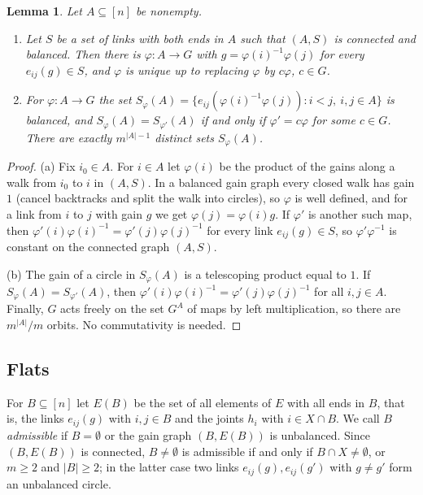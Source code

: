 \documentclass[11pt]{amsart}
\newtheorem{lemma}[theorem]{Lemma}
\theoremstyle{definition}
\theoremstyle{remark}
\numberwithin{equation}{section}
\begin{document}
\begin{lemma}\label{lem:potential}
Let $A\subseteq[n]$ be nonempty.
\begin{enumerate}[label=\textup{(\alph*)}]
\item Let $S$ be a set of links with both ends in $A$ such that $(A,S)$ is connected and balanced. Then there is $\varphi\colon A\to G$ with $g=\varphi(i)^{-1}\varphi(j)$ for every $e_{ij}(g)\in S$, and $\varphi$ is unique up to replacing $\varphi$ by $c\varphi$, $c\in G$.
\item For $\varphi\colon A\to G$ the set $S_\varphi(A)=\{e_{ij}(\varphi(i)^{-1}\varphi(j)):i<j,\ i,j\in A\}$ is balanced, and $S_\varphi(A)=S_{\varphi'}(A)$ if and only if $\varphi'=c\varphi$ for some $c\in G$. There are exactly $m^{|A|-1}$ distinct sets $S_\varphi(A)$.
\end{enumerate}
\end{lemma}

\begin{proof}
(a) Fix $i_0\in A$. For $i\in A$ let $\varphi(i)$ be the product of the gains along a walk from $i_0$ to $i$ in $(A,S)$. In a balanced gain graph every closed walk has gain $1$ (cancel backtracks and split the walk into circles), so $\varphi$ is well defined, and for a link from $i$ to $j$ with gain $g$ we get $\varphi(j)=\varphi(i)g$. If $\varphi'$ is another such map, then $\varphi'(i)\varphi(i)^{-1}=\varphi'(j)\varphi(j)^{-1}$ for every link $e_{ij}(g)\in S$, so $\varphi'\varphi^{-1}$ is constant on the connected graph $(A,S)$.

(b) The gain of a circle in $S_\varphi(A)$ is a telescoping product equal to $1$. If $S_\varphi(A)=S_{\varphi'}(A)$, then $\varphi'(i)\varphi(i)^{-1}=\varphi'(j)\varphi(j)^{-1}$ for all $i,j\in A$. Finally, $G$ acts freely on the set $G^A$ of maps by left multiplication, so there are $m^{|A|}/m$ orbits. No commutativity is needed.
\end{proof}

\subsection{Flats}
For $B\subseteq[n]$ let $E(B)$ be the set of all elements of $E$ with all ends in $B$, that is, the links $e_{ij}(g)$ with $i,j\in B$ and the joints $h_i$ with $i\in X\cap B$. We call $B$ \emph{admissible} if $B=\emptyset$ or the gain graph $(B,E(B))$ is unbalanced. Since $(B,E(B))$ is connected, $B\neq\emptyset$ is admissible if and only if $B\cap X\ne\emptyset$, or $m\ge2$ and $|B|\ge2$; in the latter case two links $e_{ij}(g),e_{ij}(g')$ with $g\ne g'$ form an unbalanced circle.
\end{document}
